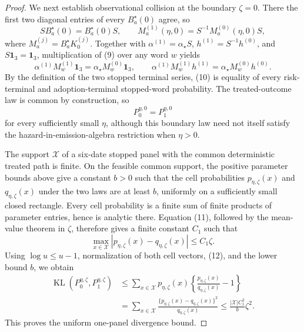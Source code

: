 \documentclass{article}
\begin{document}
\begin{proof}
We next establish observational collision at the boundary \(\zeta=0\). There the first two diagonal entries of every \(B_a^{\star}(0)\) agree, so
\[
 SB_a^{\star}(0)=B_a^{\star}(0)S,
 \qquad
 M_a^{(1)}(\eta,0)=S^{-1}M_a^{(0)}(\eta,0)S,                 \tag{9}
\]
where \(M_a^{(j)}=B_a^{\star}K_0^{(j)}\). Together with \(\alpha^{(1)}=\alpha_{\star}S\), \(h^{(1)}=S^{-1}h^{(0)}\), and \(S\mathbf 1_3=\mathbf 1_3\), multiplication of (9) over any word \(w\) yields
\[
 \alpha^{(1)}M_w^{(1)}\mathbf 1_3
 =\alpha_{\star}M_w^{(0)}\mathbf 1_3,
 \qquad
 \alpha^{(1)}M_w^{(1)}h^{(1)}
 =\alpha_{\star}M_w^{(0)}h^{(0)}.                            \tag{10}
\]
By the definition of the two stopped terminal series, (10) is equality of every risk-terminal and adoption-terminal stopped-word probability. The treated-outcome law is common by construction, so
\[
 P_0^{\eta,0}=P_1^{\eta,0}                                  \tag{11}
\]
for every sufficiently small \(\eta\), although this boundary law need not itself satisfy the hazard-in-emission-algebra restriction when \(\eta>0\).

The support \(\mathcal X\) of a six-date stopped panel with the common deterministic treated path is finite. On the feasible common support, the positive parameter bounds above give a constant \(b>0\) such that the cell probabilities \(p_{\eta,\zeta}(x)\) and \(q_{\eta,\zeta}(x)\) under the two laws are at least \(b\), uniformly on a sufficiently small closed rectangle. Every cell probability is a finite sum of finite products of parameter entries, hence is analytic there. Equation (11), followed by the mean-value theorem in \(\zeta\), therefore gives a finite constant \(C_1\) such that
\[
 \max_{x\in\mathcal X}|p_{\eta,\zeta}(x)-q_{\eta,\zeta}(x)|
 \le C_1\zeta.                                               \tag{12}
\]
Using \(\log u\le u-1\), normalization of both cell vectors, (12), and the lower bound \(b\), we obtain
\[
 \begin{aligned}
 \operatorname{KL}(P_0^{\eta,\zeta},P_1^{\eta,\zeta})
 &\le \sum_{x\in\mathcal X}p_{\eta,\zeta}(x)
       \left\{\frac{p_{\eta,\zeta}(x)}{q_{\eta,\zeta}(x)}-1\right\}\\
 &=\sum_{x\in\mathcal X}
   \frac{\{p_{\eta,\zeta}(x)-q_{\eta,\zeta}(x)\}^2}
        {q_{\eta,\zeta}(x)}
 \le \frac{|\mathcal X|C_1^2}{b}\zeta^2.                   \tag{13}
 \end{aligned}
\]
This proves the uniform one-panel divergence bound.


\end{proof}
\end{document}

